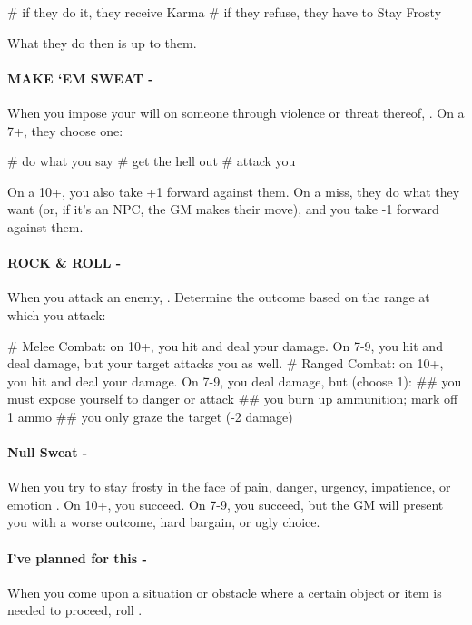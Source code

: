 \begin{easylist}
    # if they do it, they receive Karma
    # if they refuse, they have to Stay Frosty 
\end{easylist}

What they do then is up to them.


\paragraph{MAKE ‘EM SWEAT -} When you impose your will on someone through violence or threat thereof, . On a 7+, they choose one:

\begin{easylist}
    # do what you say
    # get the hell out
    # attack you
\end{easylist}

On a 10+, you also take +1 forward against them. On a miss, they do what they want (or, if it’s an NPC, the GM makes their move), and you take -1 forward against them.


\paragraph{ROCK \& ROLL -} When you attack an enemy, . Determine the outcome based on the range at which you attack:

\begin{easylist}
    # Melee Combat: on 10+, you hit and deal your damage. On 7-9, you hit and deal damage, but your target attacks you as well.
    # Ranged Combat: on 10+, you hit and deal your damage. On 7-9, you deal damage, but (choose 1):
    ## you must expose yourself to danger or attack
    ## you burn up ammunition; mark off 1 ammo
    ## you only graze the target (-2 damage)
\end{easylist}


\paragraph{Null Sweat -} When you try to stay frosty in the face of pain, danger, urgency, impatience, or emotion . On 10+, you succeed. On 7-9, you succeed, but the GM will present you with a worse outcome, hard bargain, or ugly choice.


\paragraph{I've planned for this - } When you come upon a situation or obstacle where a certain object or item is needed to proceed, roll . 


